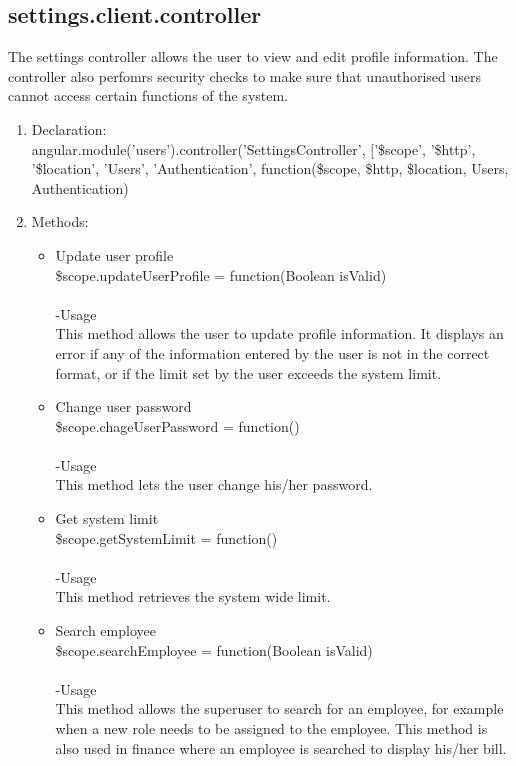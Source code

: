 \documentclass[a4paper,12pt]{article}
\begin{document}
\subsection{settings.client.controller}
 The settings controller allows the user to view and edit profile information. The controller also perfomrs security checks to make sure that unauthorised users cannot access certain functions of the system.
 \begin{enumerate}
 \item Declaration:\\angular.module('users').controller('SettingsController', ['\$scope', '\$http', '\$location', 'Users', 'Authentication',
	function(\$scope, \$http, \$location, Users, Authentication) 
	\item Methods:\\
	\begin{itemize}
	\item Update user profile\\ 
 \$scope.updateUserProfile = function(Boolean isValid) \\ \\
 -Usage\\
 This method allows the user to update profile information. It displays an error if any of the information entered by the user is not in the correct format, or if the limit set by the user exceeds the system limit. 
\item Change user password\\
 \$scope.chageUserPassword = function()\\ \\ 
-Usage\\
This method lets the user change his/her password.

\item Get system limit\\
 \$scope.getSystemLimit = function()\\ \\
-Usage\\
This method retrieves the system wide limit.

\item Search employee\\ 
 \$scope.searchEmployee = function(Boolean isValid)\\  \\
-Usage\\
This method allows the superuser to search for an employee, for example when a new role needs to be assigned to the employee.
This method is also used in finance where an employee is searched to display his/her bill. 


\end{itemize}
\end{enumerate}
\end{document}
